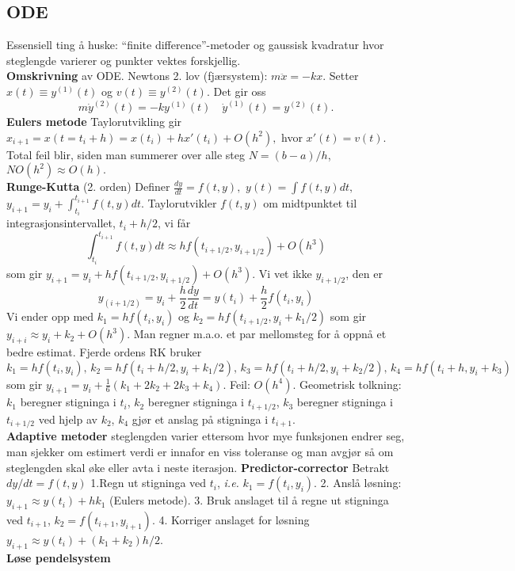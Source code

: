 \documentclass[12pt,a4paper,twocolumn]{article}
\begin{document}
\begin{flushleft}
\subsection{ODE} %
\label{sub:ode}
Essensiell ting å huske: ``finite difference''-metoder og gaussisk kvadratur hvor steglengde varierer og punkter vektes forskjellig.\\
\textbf{Omskrivning} av ODE. Newtons 2. lov (fjærsystem): $m\ddot x = -kx$. Setter $x(t) \equiv y^{(1)}(t)$ og $v(t) \equiv y^{(2)}(t)$. Det gir oss
$$ m\dot y^{(2)}(t) = - ky^{(1)}(t) \quad \dot y^{(1)}(t)=y^{(2)}(t). $$
\textbf{Eulers metode} Taylorutvikling gir $x_{i+1}=x(t=t_i+h)=x(t_i) + hx'(t_i) + O(h^2),$ hvor $x'(t) = v(t)$. Total feil blir, siden man summerer over alle steg $N = (b-a)/h$,  $NO(h^2) \approx O(h).$ \\
\textbf{Runge-Kutta} (2. orden) Definer $\frac{dy}{dt}=f(t,y),$ $y(t)=\int f(t,y) dt,$ $y_{i+1}=y_i+ \int_{t_i}^{t_{i+1}} f(t,y) dt$. Taylorutvikler $f(t,y)$ om midtpunktet til integrasjonsintervallet, $t_i +h/2$, vi får
$$  \int_{t_i}^{t_{i+1}} f(t,y) dt \approx hf(t_{i+1/2},y_{i+1/2}) +O(h^3) $$
som gir $y_{i+1}=y_i + hf(t_{i+1/2},y_{i+1/2}) +O(h^3)$. Vi vet ikke $y_{i+1/2}$, den er
$$ y_{(i+1/2)}=y_i + \frac{h}{2}\frac{dy}{dt} = y(t_i) + \frac{h}{2}f(t_i,y_i) $$
Vi ender opp med $k_1=hf(t_i,y_i)$ og $k_2=hf(t_{i+1/2},y_i+k_1/2)$ som gir $y_{i+i}\approx y_i + k_2 +O(h^3)$. Man regner m.a.o. et par mellomsteg for å oppnå et bedre estimat. Fjerde ordens RK bruker $k_1=hf(t_i,y_i),\, k_2=hf(t_i+h/2,y_i+k_1/2),\,k_3=hf(t_i+h/2,y_i+k_2/2),\,k_4=hf(t_i+h,y_i+k_3)$ som gir $y_{i+1}=y_i +\frac{1}{6}\left( k_1 +2k_2+2k_3+k_4\right).$ Feil: $O(h^4)$. Geometrisk tolkning: $k_1$ beregner stigninga i $t_i$, $k_2$ beregner stigninga i $t_{i+1/2}$, $k_3$ beregner stigninga i $t_{i+1/2}$ ved hjelp av $k_2$, $k_4$ gjør et anslag på stigninga i $t_{i+1}$.\\
\textbf{Adaptive metoder} steglengden varier ettersom hvor mye funksjonen endrer seg, man sjekker om estimert verdi er innafor en viss toleranse og man avgjør så om steglengden skal øke eller avta i neste iterasjon.
\textbf{Predictor-corrector} Betrakt $dy/dt = f(t,y)$ 1.Regn ut stigninga ved $t_i$, \emph{i.e.} $k_1 = f(t_i,y_i)$. 2. Anslå løsning: $y_{i+1}\approx y(t_i)+hk_1$ (Eulers metode). 3. Bruk anslaget til å regne ut stigninga ved $t_{i+1}$, $k_2=f(t_{i+1},y_{i+1})$. 4. Korriger anslaget for løsning $y_{i+1}\approx y(t_i) + (k_1+k_2)h/2$.\\
\textbf{Løse pendelsystem}
\begin{itemize}

\end{itemize}
\end{flushleft}
\end{document}
